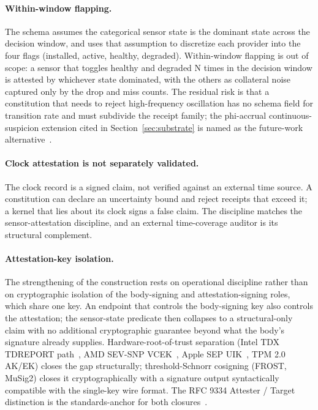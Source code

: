 \paragraph{Within-window flapping.}
The schema assumes the categorical sensor state is the dominant state across the decision window, and uses that assumption to discretize each provider into the four flags (installed, active, healthy, degraded). Within-window flapping is out of scope: a sensor that toggles healthy and degraded N times in the decision window is attested by whichever state dominated, with the others as collateral noise captured only by the drop and miss counts. The residual risk is that a constitution that needs to reject high-frequency oscillation has no schema field for transition rate and must subdivide the receipt family; the phi-accrual continuous-suspicion extension cited in Section~\ref{sec:substrate} is named as the future-work alternative~\cite{hayashibaraPhiAccrual2004,cardenasICS2008}.

\paragraph{Clock attestation is not separately validated.}
The clock record is a signed claim, not verified against an external time source. A constitution can declare an uncertainty bound and reject receipts that exceed it; a kernel that lies about its clock signs a false claim. The discipline matches the sensor-attestation discipline, and an external time-coverage auditor is its structural complement.

\paragraph{Attestation-key isolation.}
The strengthening of the construction rests on operational discipline rather than on cryptographic isolation of the body-signing and attestation-signing roles, which share one key. An endpoint that controls the body-signing key also controls the attestation; the sensor-state predicate then collapses to a structural-only claim with no additional cryptographic guarantee beyond what the body's signature already supplies. Hardware-root-of-trust separation (Intel TDX TDREPORT path~\cite{intelTDXSpec2023}, AMD SEV-SNP VCEK~\cite{amdSEVSNPSpec2025}, Apple SEP UIK~\cite{applePlatformSecurity2024}, TPM 2.0 AK/EK) closes the gap structurally; threshold-Schnorr cosigning (FROST, MuSig2) closes it cryptographically with a signature output syntactically compatible with the single-key wire format. The RFC 9334 Attester / Target distinction is the standards-anchor for both closures~\cite{rfc9334RATS}.


